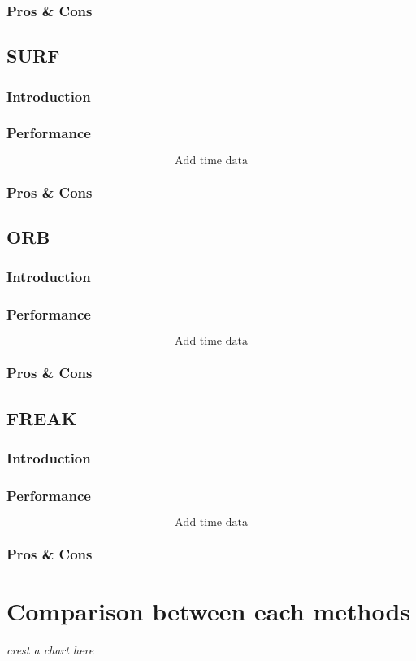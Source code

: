 		\subsubsection{Pros \& Cons}
	
	\subsection{SURF}
		\subsubsection{Introduction}
		\subsubsection{Performance}
			$$\textrm{Add time data}$$
		\subsubsection{Pros \& Cons}
	
	\subsection{ORB}
		\subsubsection{Introduction}
		\subsubsection{Performance}
			$$\textrm{Add time data}$$
		\subsubsection{Pros \& Cons}
	
	\subsection{FREAK}
		\subsubsection{Introduction}
		\subsubsection{Performance}
			$$\textrm{Add time data}$$
		\subsubsection{Pros \& Cons}

\section{Comparison between each methods}
\emph{crest a chart here}